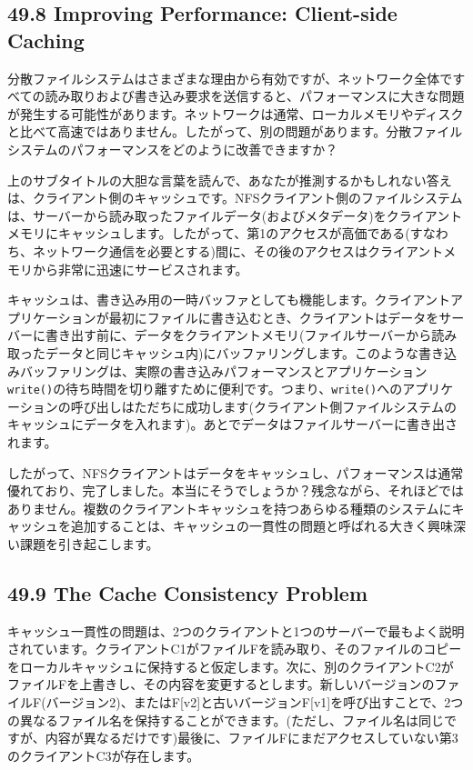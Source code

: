 \hypertarget{improving-performance-client-side-caching}{%
\subsection*{49.8 Improving Performance: Client-side
Caching}\label{improving-performance-client-side-caching}}

分散ファイルシステムはさまざまな理由から有効ですが、ネットワーク全体ですべての読み取りおよび書き込み要求を送信すると、パフォーマンスに大きな問題が発生する可能性があります。ネットワークは通常、ローカルメモリやディスクと比べて高速ではありません。したがって、別の問題があります。分散ファイルシステムのパフォーマンスをどのように改善できますか？

上のサブタイトルの大胆な言葉を読んで、あなたが推測するかもしれない答えは、クライアント側のキャッシュです。NFSクライアント側のファイルシステムは、サーバーから読み取ったファイルデータ(およびメタデータ)をクライアントメモリにキャッシュします。したがって、第1のアクセスが高価である(すなわち、ネットワーク通信を必要とする)間に、その後のアクセスはクライアントメモリから非常に迅速にサービスされます。

キャッシュは、書き込み用の一時バッファとしても機能します。クライアントアプリケーションが最初にファイルに書き込むとき、クライアントはデータをサーバーに書き出す前に、データをクライアントメモリ(ファイルサーバーから読み取ったデータと同じキャッシュ内)にバッファリングします。このような書き込みバッファリングは、実際の書き込みパフォーマンスとアプリケーション\texttt{write()}の待ち時間を切り離すために便利です。つまり、\texttt{write()}へのアプリケーションの呼び出しはただちに成功します(クライアント側ファイルシステムのキャッシュにデータを入れます)。あとでデータはファイルサーバーに書き出されます。

したがって、NFSクライアントはデータをキャッシュし、パフォーマンスは通常優れており、完了しました。本当にそうでしょうか？残念ながら、それほどではありません。複数のクライアントキャッシュを持つあらゆる種類のシステムにキャッシュを追加することは、キャッシュの一貫性の問題と呼ばれる大きく興味深い課題を引き起こします。

\hypertarget{the-cache-consistency-problem}{%
\subsection*{49.9 The Cache Consistency
Problem}\label{the-cache-consistency-problem}}

キャッシュ一貫性の問題は、2つのクライアントと1つのサーバーで最もよく説明されています。クライアントC1がファイルFを読み取り、そのファイルのコピーをローカルキャッシュに保持すると仮定します。次に、別のクライアントC2がファイルFを上書きし、その内容を変更するとします。新しいバージョンのファイルF(バージョン2)、またはF{[}v2{]}と古いバージョンF{[}v1{]}を呼び出すことで、2つの異なるファイル名を保持することができます。(ただし、ファイル名は同じですが、内容が異なるだけです)最後に、ファイルFにまだアクセスしていない第3のクライアントC3が存在します。


